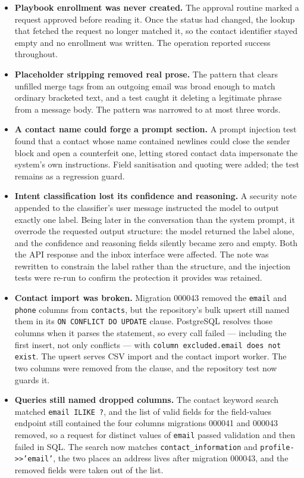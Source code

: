 \documentclass[a4paper]{article}
\begin{document}
\begin{itemize}
  \item \textbf{Playbook enrollment was never created.} The approval routine
    marked a request approved before reading it. Once the status had changed,
    the lookup that fetched the request no longer matched it, so the contact
    identifier stayed empty and no enrollment was written. The operation
    reported success throughout.
  \item \textbf{Placeholder stripping removed real prose.} The pattern that
    clears unfilled merge tags from an outgoing email was broad enough to
    match ordinary bracketed text, and a test caught it deleting a legitimate
    phrase from a message body. The pattern was narrowed to at most three
    words.
  \item \textbf{A contact name could forge a prompt section.} A prompt
    injection test found that a contact whose name contained newlines could
    close the sender block and open a counterfeit one, letting stored contact
    data impersonate the system's own instructions. Field sanitisation and
    quoting were added; the test remains as a regression guard.
  \item \textbf{Intent classification lost its confidence and reasoning.} A
    security note appended to the classifier's user message instructed the
    model to output exactly one label. Being later in the conversation than
    the system prompt, it overrode the requested output structure: the model
    returned the label alone, and the confidence and reasoning fields silently
    became zero and empty. Both the API response and the inbox interface were
    affected. The note was rewritten to constrain the label rather than the
    structure, and the injection tests were re-run to confirm the protection
    it provides was retained.
  \item \textbf{Contact import was broken.} Migration 000043 removed the
    \texttt{email} and \texttt{phone} columns from \texttt{contacts}, but the
    repository's bulk upsert still named them in its
    \texttt{ON CONFLICT DO UPDATE} clause. PostgreSQL resolves those columns
    when it parses the statement, so every call failed --- including the first
    insert, not only conflicts --- with \texttt{column excluded.email does not
    exist}. The upsert serves CSV import and the contact import worker. The two
    columns were removed from the clause, and the repository test now guards
    it.
  \item \textbf{Queries still named dropped columns.} The contact keyword
    search matched \texttt{email ILIKE ?}, and the list of valid fields for the
    field-values endpoint still contained the four columns migrations 000041
    and 000043 removed, so a request for distinct values of \texttt{email}
    passed validation and then failed in SQL. The search now matches
    \texttt{contact\_information} and \texttt{profile->>'email'}, the two places
    an address lives after migration 000043, and the removed fields were taken
    out of the list.
\end{itemize}
\end{document}
